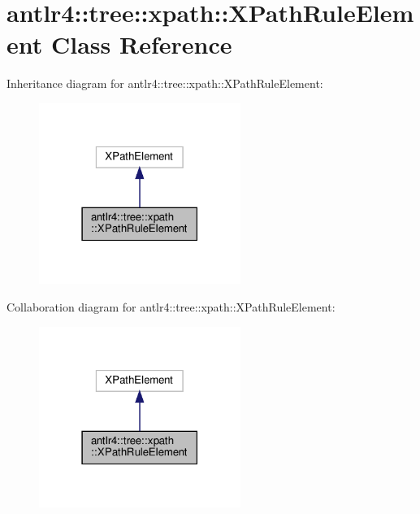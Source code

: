 \hypertarget{classantlr4_1_1tree_1_1xpath_1_1XPathRuleElement}{}\section{antlr4\+:\+:tree\+:\+:xpath\+:\+:X\+Path\+Rule\+Element Class Reference}
\label{classantlr4_1_1tree_1_1xpath_1_1XPathRuleElement}


Inheritance diagram for antlr4\+:\+:tree\+:\+:xpath\+:\+:X\+Path\+Rule\+Element\+:
\nopagebreak
\begin{figure}[H]
\begin{center}
\leavevmode
\includegraphics[width=186pt]{classantlr4_1_1tree_1_1xpath_1_1XPathRuleElement__inherit__graph}
\end{center}
\end{figure}


Collaboration diagram for antlr4\+:\+:tree\+:\+:xpath\+:\+:X\+Path\+Rule\+Element\+:
\nopagebreak
\begin{figure}[H]
\begin{center}
\leavevmode
\includegraphics[width=186pt]{classantlr4_1_1tree_1_1xpath_1_1XPathRuleElement__coll__graph}
\end{center}
\end{figure}
